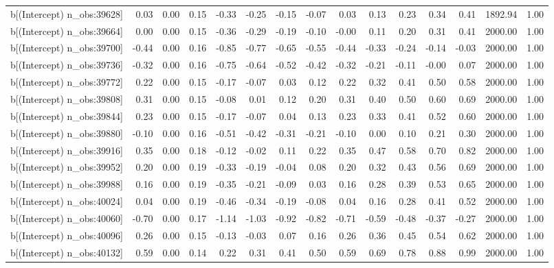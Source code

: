\begin{table}[ht]
\begin{tabular}{rrrrrrrrrrrrrrr}
  b[(Intercept) n\_obs:39628] & 0.03 & 0.00 & 0.15 & -0.33 & -0.25 & -0.15 & -0.07 & 0.03 & 0.13 & 0.23 & 0.34 & 0.41 & 1892.94 & 1.00 \\ 
  b[(Intercept) n\_obs:39664] & 0.00 & 0.00 & 0.15 & -0.36 & -0.29 & -0.19 & -0.10 & -0.00 & 0.11 & 0.20 & 0.31 & 0.41 & 2000.00 & 1.00 \\ 
  b[(Intercept) n\_obs:39700] & -0.44 & 0.00 & 0.16 & -0.85 & -0.77 & -0.65 & -0.55 & -0.44 & -0.33 & -0.24 & -0.14 & -0.03 & 2000.00 & 1.00 \\ 
  b[(Intercept) n\_obs:39736] & -0.32 & 0.00 & 0.16 & -0.75 & -0.64 & -0.52 & -0.42 & -0.32 & -0.21 & -0.11 & -0.00 & 0.07 & 2000.00 & 1.00 \\ 
  b[(Intercept) n\_obs:39772] & 0.22 & 0.00 & 0.15 & -0.17 & -0.07 & 0.03 & 0.12 & 0.22 & 0.32 & 0.41 & 0.50 & 0.58 & 2000.00 & 1.00 \\ 
  b[(Intercept) n\_obs:39808] & 0.31 & 0.00 & 0.15 & -0.08 & 0.01 & 0.12 & 0.20 & 0.31 & 0.40 & 0.50 & 0.60 & 0.69 & 2000.00 & 1.00 \\ 
  b[(Intercept) n\_obs:39844] & 0.23 & 0.00 & 0.15 & -0.17 & -0.07 & 0.04 & 0.13 & 0.23 & 0.33 & 0.41 & 0.52 & 0.60 & 2000.00 & 1.00 \\ 
  b[(Intercept) n\_obs:39880] & -0.10 & 0.00 & 0.16 & -0.51 & -0.42 & -0.31 & -0.21 & -0.10 & 0.00 & 0.10 & 0.21 & 0.30 & 2000.00 & 1.00 \\ 
  b[(Intercept) n\_obs:39916] & 0.35 & 0.00 & 0.18 & -0.12 & -0.02 & 0.11 & 0.22 & 0.35 & 0.47 & 0.58 & 0.70 & 0.82 & 2000.00 & 1.00 \\ 
  b[(Intercept) n\_obs:39952] & 0.20 & 0.00 & 0.19 & -0.33 & -0.19 & -0.04 & 0.08 & 0.20 & 0.32 & 0.43 & 0.56 & 0.69 & 2000.00 & 1.00 \\ 
  b[(Intercept) n\_obs:39988] & 0.16 & 0.00 & 0.19 & -0.35 & -0.21 & -0.09 & 0.03 & 0.16 & 0.28 & 0.39 & 0.53 & 0.65 & 2000.00 & 1.00 \\ 
  b[(Intercept) n\_obs:40024] & 0.04 & 0.00 & 0.19 & -0.46 & -0.34 & -0.19 & -0.08 & 0.04 & 0.16 & 0.28 & 0.41 & 0.52 & 2000.00 & 1.00 \\ 
  b[(Intercept) n\_obs:40060] & -0.70 & 0.00 & 0.17 & -1.14 & -1.03 & -0.92 & -0.82 & -0.71 & -0.59 & -0.48 & -0.37 & -0.27 & 2000.00 & 1.00 \\ 
  b[(Intercept) n\_obs:40096] & 0.26 & 0.00 & 0.15 & -0.13 & -0.03 & 0.07 & 0.16 & 0.26 & 0.36 & 0.45 & 0.54 & 0.62 & 2000.00 & 1.00 \\ 
  b[(Intercept) n\_obs:40132] & 0.59 & 0.00 & 0.14 & 0.22 & 0.31 & 0.41 & 0.50 & 0.59 & 0.69 & 0.78 & 0.88 & 0.99 & 2000.00 & 1.00 \\ 

\end{tabular}
\end{table}
